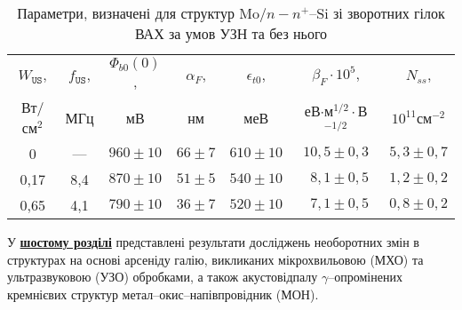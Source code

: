 \begin{table}[hb]
\caption{Параметри, визначені для структур Mo$/n-n^+$--Si зі зворотних гілок ВАХ за умов УЗН та без нього}
\label{tabSDBParZv}
\centering
\begin{tabular}{|c|c|c|c|c|c|c|}
\hline
$W_\mathtt{US}$, &$f_\mathtt{US}$,&$\Phi_{b0}(0)$,&$\alpha_F$,&$\epsilon_{t0}$,&$\beta_F\cdot10^{5}$,&$N_{ss}$,\\
Вт/см$^2$&МГц&мВ&нм&меВ&еВ$\cdot$м$^{1/2}\cdot$В$^{-1/2}$&$10^{11}$см$^{-2}$\\\hline
0&---&$960\pm10$&$66\pm7$&$610\pm10$&$10,5\pm0,3$&$5,3\pm0,7$\\\hline
0,17&8,4&$870\pm10$&$51\pm5$&$540\pm10$&$\;\:8,1\pm0,5$&$1,2\pm0,2$\\\hline
0,65&4,1&$790\pm10$&$36\pm7$&$520\pm10$&$\;\:7,1\pm0,5$&$0,8\pm0,2$\\\hline
\end{tabular}
\end{table}

У  \underline{\textbf{шостому розділі}} представлені результати досліджень необоротних змін в структурах на основі арсеніду галію, викликаних мікрохвильовою (МХО) та ультразвуковою (УЗО) обробками,
а також акустовідпалу $\gamma$--опромінених кремнієвих структур метал--окис--напівпровідник (МОН).

